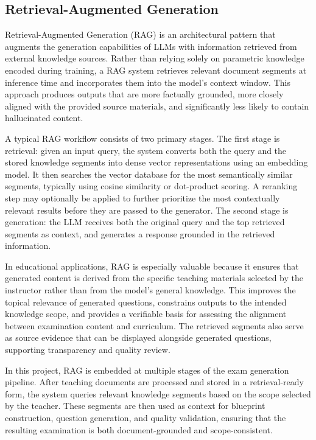 \documentclass[12pt,a4paper]{article}
\begin{document}
\subsection{Retrieval-Augmented Generation}

Retrieval-Augmented Generation (RAG) is an architectural pattern that augments the generation capabilities of LLMs with information retrieved from external knowledge sources. Rather than relying solely on parametric knowledge encoded during training, a RAG system retrieves relevant document segments at inference time and incorporates them into the model's context window. This approach produces outputs that are more factually grounded, more closely aligned with the provided source materials, and significantly less likely to contain hallucinated content.

A typical RAG workflow consists of two primary stages. The first stage is retrieval: given an input query, the system converts both the query and the stored knowledge segments into dense vector representations using an embedding model. It then searches the vector database for the most semantically similar segments, typically using cosine similarity or dot-product scoring. A reranking step may optionally be applied to further prioritize the most contextually relevant results before they are passed to the generator. The second stage is generation: the LLM receives both the original query and the top retrieved segments as context, and generates a response grounded in the retrieved information.

In educational applications, RAG is especially valuable because it ensures that generated content is derived from the specific teaching materials selected by the instructor rather than from the model's general knowledge. This improves the topical relevance of generated questions, constrains outputs to the intended knowledge scope, and provides a verifiable basis for assessing the alignment between examination content and curriculum. The retrieved segments also serve as source evidence that can be displayed alongside generated questions, supporting transparency and quality review.

In this project, RAG is embedded at multiple stages of the exam generation pipeline. After teaching documents are processed and stored in a retrieval-ready form, the system queries relevant knowledge segments based on the scope selected by the teacher. These segments are then used as context for blueprint construction, question generation, and quality validation, ensuring that the resulting examination is both document-grounded and scope-consistent.
\end{document}
